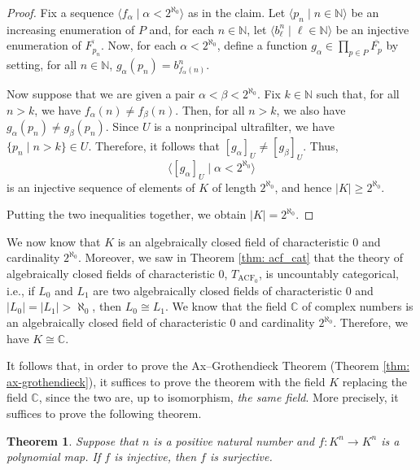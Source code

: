 \documentclass[a4paper]{memoir}
\newtheorem{theorem}{Theorem}[section]
\theoremstyle{definition}
\newcommand{\bb}{\mathbb}
\newcommand{\ra}{\rightarrow}
\begin{document}
\begin{proof}
  Fix a sequence $\langle f_\alpha \mid \alpha < 2^{\aleph_0} \rangle$ as in the claim. 
  Let $\langle p_n \mid n \in \bb{N} \rangle$ be an increasing enumeration of $P$ and, 
  for each $n \in \bb{N}$, let $\langle b^n_\ell \mid \ell \in \bb{N} \rangle$ be an injective 
  enumeration of $\overline{F_{p_n}}$. Now, for each $\alpha < 2^{\aleph_0}$, define a function 
  $g_\alpha \in \prod_{p \in P} \overline{F_p}$ by setting, for all $n \in \bb{N}$, 
  $g_\alpha(p_n) = b^n_{f_\alpha(n)}$.
  
  Now suppose that we are given a pair $\alpha < \beta < 2^{\aleph_0}$. Fix $k \in \bb{N}$ such 
  that, for all $n > k$, we have $f_\alpha(n) \neq f_\beta(n)$. Then, for all 
  $n > k$, we also have $g_\alpha(p_n) \neq g_\beta(p_n)$. Since $U$ is a nonprincipal ultrafilter, 
  we have $\{p_n \mid n > k\} \in U$. Therefore, it follows that $[g_\alpha]_U \neq [g_\beta]_U$. 
  Thus,
  \[
    \langle [g_\alpha]_U \mid \alpha < 2^{\aleph_0} \rangle
  \]
  is an injective sequence of elements of $K$ of length $2^{\aleph_0}$, and hence 
  $|K| \geq 2^{\aleph_0}$. 
  
  Putting the two inequalities together, we obtain $|K| = 2^{\aleph_0}$.
\end{proof}

We now know that $K$ is an algebraically closed field of characteristic $0$ and cardinality 
$2^{\aleph_0}$. Moreover, we saw in Theorem \ref{thm: acf_cat} that the theory of algebraically 
closed fields of characteristic $0$, $T_{\mathrm{ACF}_0}$, is uncountably categorical, i.e., 
if $L_0$ and $L_1$ are two algebraically closed fields of characteristic $0$ and 
$|L_0| = |L_1| > \aleph_0$, then $L_0 \cong L_1$. We know that the field $\bb{C}$ of complex 
numbers is an algebraically closed field of characteristic $0$ and cardinality 
$2^{\aleph_0}$. Therefore, we have $K \cong \bb{C}$.

It follows that, in order to prove the Ax--Grothendieck Theorem (Theorem \ref{thm: ax-grothendieck}), 
it suffices to prove the theorem with the field $K$ replacing the field $\bb{C}$, since the two are, 
up to isomorphism, \emph{the same field}. More precisely, it suffices to prove the following theorem.

\begin{theorem}
  Suppose that $n$ is a positive natural number and $f : K^n \ra K^n$ is a polynomial map. 
  If $f$ is injective, then $f$ is surjective.
\end{theorem}
\end{document}
